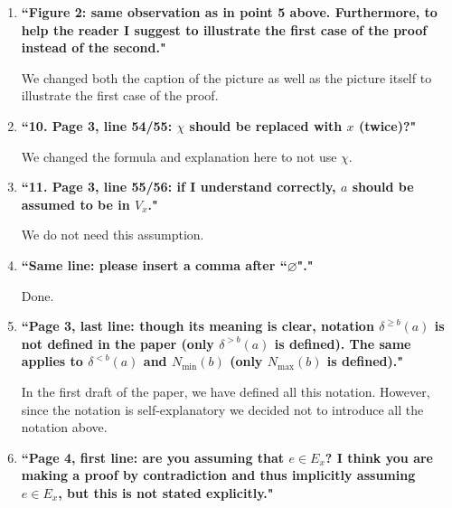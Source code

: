 \documentclass[11pt]{article}
\begin{document}
\begin{enumerate}
	\bigskip

	\item \textbf{``Figure 2: same observation as in point 5 above. Furthermore, to help the reader I
suggest to illustrate the first case of the proof instead of the second."}
	
	\smallskip
	
       We changed both the caption of the picture as well as the picture itself to illustrate the first case of the proof.
	
	\bigskip

	\item \textbf{``10. Page 3, line 54/55: $\chi$ should be replaced with $x$ (twice)?"}
	
	\smallskip
	
	We changed the formula and explanation here to not use $\chi$.
	
	\bigskip
	
	\item \textbf{``11. Page 3, line 55/56: if I understand correctly, $a$ should be assumed to be in $V_x$."}
	
	\smallskip
	
	We do not need this assumption.
	
	\bigskip
	
	\item \textbf{``Same line: please insert a comma after ``$\varnothing$"."}
	
	\smallskip
	
	Done.
	
	\bigskip
	
	\item \textbf{``Page 3, last line: though its meaning is clear, notation $\delta^{\ge b}(a)$ is not defined in the paper (only $\delta^{> b}(a)$ is defined). The same applies to $\delta^{< b}(a)$ and $N_{\min}(b)$ (only $N_{\max}(b)$ is defined)."}
	
	\smallskip
	
	In the first draft of the paper, we have defined all this notation. However, since the notation is self-explanatory we decided not to introduce all the notation above.
	
	\bigskip
	
	\item \textbf{``Page 4, first line: are you assuming that $e\in E_x$? I think you are making a proof by
contradiction and thus implicitly assuming $e\in E_x$, but this is not stated explicitly."}
	
	\smallskip
	

\end{enumerate}
\end{document}
